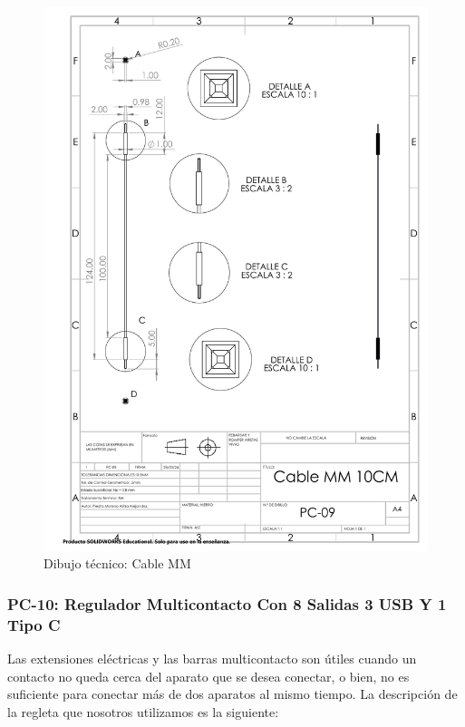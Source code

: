     \begin{figure}[H]
        \centering
        \includegraphics[trim = {7mm 1mm 1mm 1mm},clip,scale=0.4]{22/Img/cableMMDibujo.PDF}
        \caption{Dibujo técnico: Cable MM}
        \label{fig:Cable MM}
    \end{figure}
    
    \subsubsection{PC-10: Regulador Multicontacto Con 8 Salidas 3 USB Y 1 Tipo C }
    
    Las extensiones eléctricas y las barras multicontacto son útiles cuando un contacto no queda cerca del aparato que se desea conectar, o bien, no es suficiente para conectar más de dos aparatos al mismo tiempo.
    La descripción de la regleta que nosotros utilizamos es la siguiente:
    
